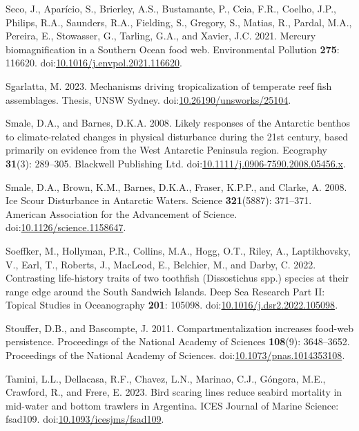 \documentclass[
]{article}
\newlength{\cslhangindent}
\newenvironment{CSLReferences}[2] %
 {\begin{list}{}{%
  \setlength{\itemindent}{0pt}
  \setlength{\leftmargin}{0pt}
  \setlength{\parsep}{0pt}
  \ifodd #1
   \setlength{\leftmargin}{\cslhangindent}
   \setlength{\itemindent}{-1\cslhangindent}
  \fi
  \setlength{\itemsep}{#2\baselineskip}}}
 {\end{list}}
\begin{document}
\begin{CSLReferences}{1}{0}
Seco, J., Aparício, S., Brierley, A.S., Bustamante, P., Ceia, F.R.,
Coelho, J.P., Philips, R.A., Saunders, R.A., Fielding, S., Gregory, S.,
Matias, R., Pardal, M.A., Pereira, E., Stowasser, G., Tarling, G.A., and
Xavier, J.C. 2021. Mercury biomagnification in a {Southern Ocean} food
web. Environmental Pollution \textbf{275}: 116620.
doi:\href{https://doi.org/10.1016/j.envpol.2021.116620}{10.1016/j.envpol.2021.116620}.

Sgarlatta, M. 2023. Mechanisms driving tropicalization of temperate reef
fish assemblages. Thesis, UNSW Sydney.
doi:\href{https://doi.org/10.26190/unsworks/25104}{10.26190/unsworks/25104}.

Smale, D.A., and Barnes, D.K.A. 2008. Likely responses of the
{Antarctic} benthos to climate-related changes in physical disturbance
during the 21st century, based primarily on evidence from the {West
Antarctic Peninsula} region. Ecography \textbf{31}(3): 289--305.
Blackwell Publishing Ltd.
doi:\href{https://doi.org/10.1111/j.0906-7590.2008.05456.x}{10.1111/j.0906-7590.2008.05456.x}.

Smale, D.A., Brown, K.M., Barnes, D.K.A., Fraser, K.P.P., and Clarke, A.
2008. Ice {Scour Disturbance} in {Antarctic Waters}. Science
\textbf{321}(5887): 371--371. American Association for the Advancement
of Science.
doi:\href{https://doi.org/10.1126/science.1158647}{10.1126/science.1158647}.

Soeffker, M., Hollyman, P.R., Collins, M.A., Hogg, O.T., Riley, A.,
Laptikhovsky, V., Earl, T., Roberts, J., MacLeod, E., Belchier, M., and
Darby, C. 2022. Contrasting life-history traits of two toothfish
({Dissostichus} spp.) species at their range edge around the {South
Sandwich Islands}. Deep Sea Research Part II: Topical Studies in
Oceanography \textbf{201}: 105098.
doi:\href{https://doi.org/10.1016/j.dsr2.2022.105098}{10.1016/j.dsr2.2022.105098}.

Stouffer, D.B., and Bascompte, J. 2011. Compartmentalization increases
food-web persistence. Proceedings of the National Academy of Sciences
\textbf{108}(9): 3648--3652. Proceedings of the National Academy of
Sciences.
doi:\href{https://doi.org/10.1073/pnas.1014353108}{10.1073/pnas.1014353108}.

Tamini, L.L., Dellacasa, R.F., Chavez, L.N., Marinao, C.J., Góngora,
M.E., Crawford, R., and Frere, E. 2023. Bird scaring lines reduce
seabird mortality in mid-water and bottom trawlers in {Argentina}. ICES
Journal of Marine Science: fsad109.
doi:\href{https://doi.org/10.1093/icesjms/fsad109}{10.1093/icesjms/fsad109}.


\end{CSLReferences}
\end{document}
